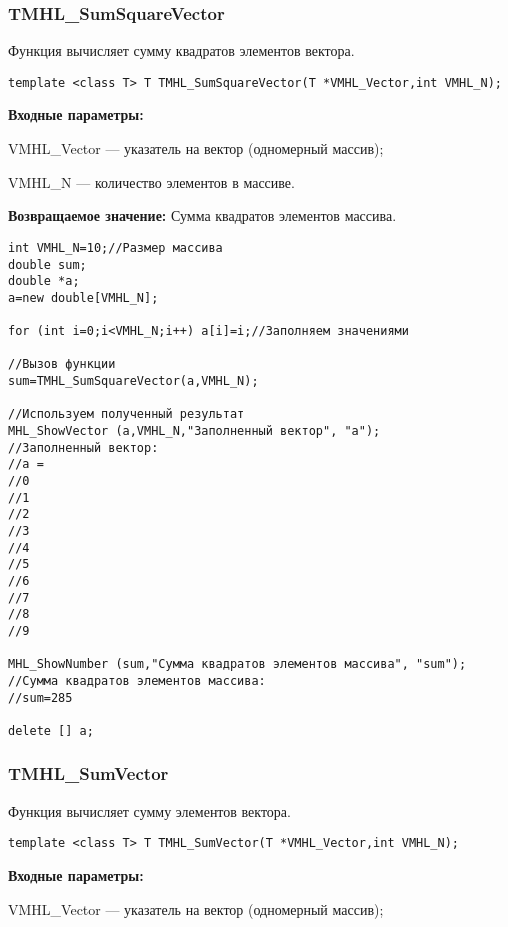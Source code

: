 \documentclass[a4paper,12pt]{article}
\begin{document}
\subsubsection{TMHL\_SumSquareVector}\label{TMHL_SumSquareVector}

Функция вычисляет сумму квадратов элементов вектора.


\begin{lstlisting}[label=code_syntax_TMHL_SumSquareVector,caption=Синтаксис]
template <class T> T TMHL_SumSquareVector(T *VMHL_Vector,int VMHL_N);
\end{lstlisting}

\textbf{Входные параметры:}

 VMHL\_Vector --- указатель на вектор (одномерный массив);
 
 VMHL\_N --- количество элементов в массиве.

\textbf{Возвращаемое значение:}
Сумма квадратов элементов массива.


\begin{lstlisting}[label=code_use_TMHL_SumSquareVector,caption=Пример использования]
int VMHL_N=10;//Размер массива
double sum;
double *a;
a=new double[VMHL_N];

for (int i=0;i<VMHL_N;i++) a[i]=i;//Заполняем значениями

//Вызов функции
sum=TMHL_SumSquareVector(a,VMHL_N);

//Используем полученный результат
MHL_ShowVector (a,VMHL_N,"Заполненный вектор", "a");
//Заполненный вектор:
//a =
//0
//1
//2
//3
//4
//5
//6
//7
//8
//9

MHL_ShowNumber (sum,"Сумма квадратов элементов массива", "sum");
//Сумма квадратов элементов массива:
//sum=285

delete [] a;
\end{lstlisting}

\subsubsection{TMHL\_SumVector}\label{TMHL_SumVector}

Функция вычисляет сумму элементов вектора.


\begin{lstlisting}[label=code_syntax_TMHL_SumVector,caption=Синтаксис]
template <class T> T TMHL_SumVector(T *VMHL_Vector,int VMHL_N);
\end{lstlisting}

\textbf{Входные параметры:}

 VMHL\_Vector --- указатель на вектор (одномерный массив);
 
\end{document}
